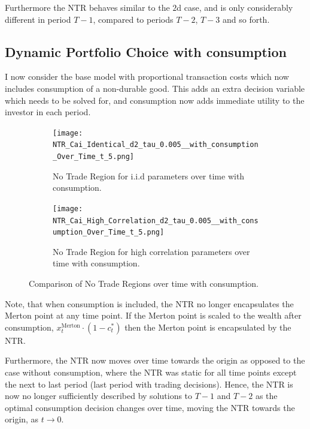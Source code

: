 \documentclass[11pt]{article}
\begin{document}
Furthermore the \ac{NTR} behaves similar to the $2$d case, and is only considerably different in period $T-1$,
compared to periods $T-2$, $T-3$ and so forth.

\subsection{Dynamic Portfolio Choice with consumption} \label{Subsection: Results_WithConsumption}
I now consider the base model with proportional transaction costs which now includes consumption of a non-durable good.
This adds an extra decision variable which needs to be solved for, and consumption now adds immediate utility to the investor in each period.
\begin{figure}[!ht]
    \centering
    \begin{subfigure}[t]{0.48\textwidth}
        \centering
        \texttt{[image: NTR\_Cai\_Identical\_d2\_tau\_0.005\_\_with\_consumption\_Over\_Time\_t\_5.png]}
        \caption{No Trade Region for i.i.d parameters over time with consumption.}
        \label{fig:NTR_2d_iid_with_consumption_over_time}
    \end{subfigure}%
    \hfill
    \begin{subfigure}[t]{0.48\textwidth}
        \centering
        \texttt{[image: NTR\_Cai\_High\_Correlation\_d2\_tau\_0.005\_\_with\_consumption\_Over\_Time\_t\_5.png]}
        \caption{No Trade Region for high correlation parameters over time with consumption.}
        \label{fig:NTR_2d_high_correlation_with_consumption_over_time}
    \end{subfigure}
    \caption{Comparison of No Trade Regions over time with consumption.}
\end{figure}

Note, that when consumption is included, the \ac{NTR} no longer encapsulates the Merton point at any time point.
If the Merton point is scaled to the wealth after consumption, $x^{\text{Merton}}_{t}\cdot(1-c^{*}_{t})$ then the Merton point is encapsulated by the \ac{NTR}.

Furthermore, the \ac{NTR} now moves over time towards the origin as opposed to the case without consumption,
where the \ac{NTR} was static for all time points except the next to last period (last period with trading decisions).
Hence, the \ac{NTR} is now no longer sufficiently described by solutions to $T-1$ and $T-2$ as the optimal consumption decision
changes over time, moving the NTR towards the origin, as $t \rightarrow 0$.
\end{document}
